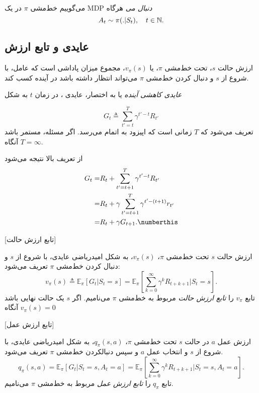 
می‌گوییم خط‌مشی $\pi$ در یک
 MDP
  \textit{
  	دنبال می
  }
   هرگاه
$$A_t \sim \pi(. |S_t),	 \quad t \in \mathbb{N}.$$




\subsection{عایدی و تابع ارزش}

ارزش حالت $s$، تحت خط‌مشی $\pi$، یا
 $v_\pi(s)$،
مجموع میزان پاداشی است که عامل، با شروع از $s$ و دنبال کردن خط‌مشی $\pi$ می‌تواند انتظار داشته باشد در آینده کسب کند.

\textit{عایدی کاهشی آینده}
 یا به اختصار، عایدی ، در زمان $t$ به شکل

$$G_t \triangleq \sum_{t'=t}^{T} \gamma^{t'-t} R_{t'}$$
تعریف می‌شود که $T$ زمانی است که اپیزود به اتمام می‌رسد. اگر مسئله، مستمر باشد آنگاه 
$T=\infty$.

از تعریف بالا نتیجه می‌شود 
\begin{align}
G_t =& R_t + \sum_{t'=t+1}^{T} \gamma^{t'-t} R_{t'} \nonumber \\
=& R_t + \gamma \sum_{t'=t+1}^{T} \gamma^{t' - (t+1)} r_{t'} \nonumber \\
=& R_t + \gamma G_{t+1}. \numberthis
\end{align}

[تابع ارزش حالت]

 ارزش حالت  $s$ تحت خط‌مشی 
 $\pi$،
 $v_\pi(s)$،
  به شکل امیدریاضی عایدی، با شروع از $s$ و دنبال کردن خط‌مشی $\pi$ تعریف می‌شود:
$$v_\pi(s) \triangleq \mathbb{E}_\pi\left[G_t| S_t=s\right] = \mathbb{E}_\pi\left[\sum_{k=0}^{\infty} \gamma^k R_{t+k+1}|S_t =s \right].$$
تابع $v_\pi$ را 
\textit{تابع ارزش حالت}
 مربوط به خط‌مشی 
$\pi$
می‌نامیم. اگر $s$ یک حالت نهایی باشد آنگاه 
$v_\pi(s) = 0$

\label{statevaluedef}

[تابع ارزش عمل]

ارزش عمل  $a$ در حالت
$s$
 تحت خط‌مشی 
$\pi$،
$q_\pi(s,a)$،
  به شکل امیدریاضی عایدی، با شروع از $s$ و انتخاب عمل $a$  و سپس دنبال\nf کردن خط‌مشی $\pi$ تعریف می‌شود.
$$q_\pi(s,a) = \mathbb{E}_\pi\left[G_t| S_t=s, A_t=a\right] = \mathbb{E}_\pi\left[\sum_{k=0}^{\infty} \gamma^k R_{t+k+1}|S_t =s, A_t=a \right].$$
تابع $q_\pi$ را 
\textit{تابع ارزش عمل}
 مربوط به خط‌مشی 
$\pi$
می‌نامیم.
